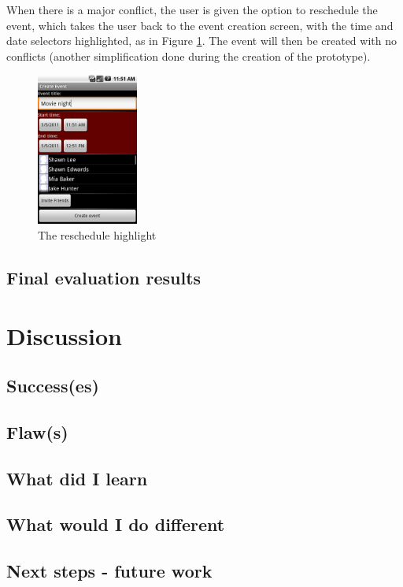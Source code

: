 \documentclass[]{report}
\begin{document}
When there is a major conflict, the user is given the option to reschedule the
event, which takes the user back to the event creation screen, with the time and
date selectors highlighted, as in Figure \ref{fig:reschedule}. The event will
then be created with no conflicts (another simplification done during the
creation of the prototype).

\begin{figure}[htb]
  \centering
  \includegraphics[height=50mm]{reschedule}
  \caption{The reschedule highlight}
  \label{fig:reschedule}
\end{figure}

\section{Final evaluation results}

\chapter{Discussion}

\section{Success(es)}

\section{Flaw(s)}

\section{What did I learn}

\section{What would I do different}

\section{Next steps - future work}
\end{document}
